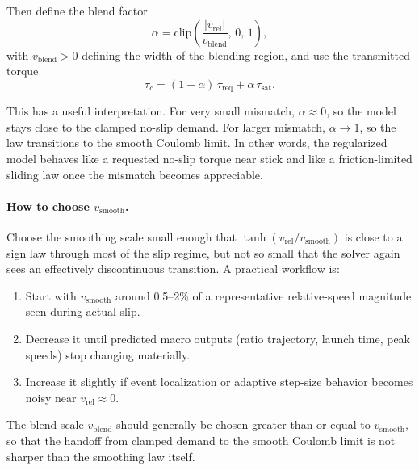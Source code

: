 \documentclass[11pt]{article}
\numberwithin{equation}{section}
\begin{document}
Then define the blend factor
\begin{equation}
\alpha
=
\mathrm{clip}\!\left(\frac{|v_{\mathrm{rel}}|}{v_{\mathrm{blend}}},\,0,\,1\right),
\label{eq:alpha_blend_impl}
\end{equation}
with $v_{\mathrm{blend}}>0$ defining the width of the blending region, and use
the transmitted torque
\begin{equation}
\tau_c
=
(1-\alpha)\,\tau_{\mathrm{req}} + \alpha\,\tau_{\mathrm{sat}}.
\label{eq:tau_blend_impl}
\end{equation}

This has a useful interpretation. For very small mismatch,
$\alpha\approx 0$, so the model stays close to the clamped no-slip demand.
For larger mismatch, $\alpha\to 1$, so the law transitions to the smooth
Coulomb limit. In other words, the regularized model behaves like a requested
no-slip torque near stick and like a friction-limited sliding law once the
mismatch becomes appreciable.

\paragraph{How to choose $v_{\mathrm{smooth}}$.}

Choose the smoothing scale small enough that
$\tanh(v_{\mathrm{rel}}/v_{\mathrm{smooth}})$ is close to a sign law
through most of the slip regime, but not so small that the solver again sees an
effectively discontinuous transition. A practical workflow is:
\begin{enumerate}
\item Start with $v_{\mathrm{smooth}}$ around 0.5--2\% of a representative
  relative-speed magnitude seen during actual slip.
\item Decrease it until predicted macro outputs (ratio trajectory, launch time,
  peak speeds) stop changing materially.
\item Increase it slightly if event localization or adaptive step-size behavior
  becomes noisy near $v_{\mathrm{rel}}\approx 0$.
\end{enumerate}

The blend scale $v_{\mathrm{blend}}$ should generally be chosen greater than or
equal to $v_{\mathrm{smooth}}$, so that the handoff from clamped demand to the
smooth Coulomb limit is not sharper than the smoothing law itself.


\newpage


\end{document}
